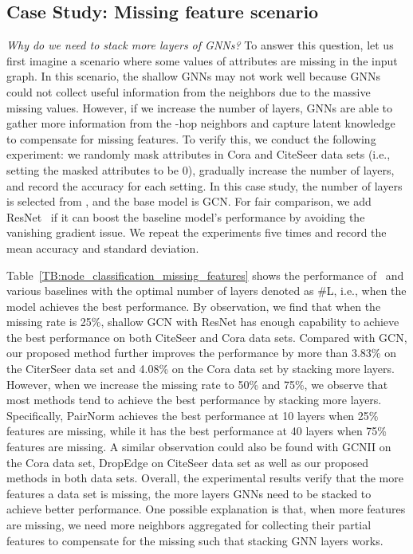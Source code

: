 \subsection{Case Study: Missing feature scenario}
\label{Missing_feature_scenario}
\emph{Why do we need to stack more layers of GNNs?} To answer this question, let us first imagine a scenario where some values of attributes are missing in the input graph. In this scenario, the shallow GNNs may not work well because GNNs could not collect useful information from the neighbors due to the massive missing values. However, if we increase the number of layers, GNNs are able to gather more information from the -hop neighbors and capture latent knowledge to compensate for missing features. To verify this, we conduct the following experiment: we randomly mask  attributes in Cora and CiteSeer data sets (i.e., setting the masked attributes to be 0), gradually increase the number of layers, and record the accuracy for each setting. In this case study, the number of layers is selected from , and the base model is GCN. For fair comparison, we add ResNet~\citep{DBLP:conf/cvpr/HeZRS16} if it can boost the baseline model's performance by avoiding the vanishing gradient issue. We repeat the experiments five times and record the mean accuracy and standard deviation. 


Table~\ref{TB:node_classification_missing_features} shows the performance of \name\ and various baselines with the optimal number of layers denoted as \#L, i.e., when the model achieves the best performance. By observation, we find that when the missing rate is 25\%, shallow GCN with ResNet has enough capability to achieve the best performance on both CiteSeer and Cora data sets. Compared with GCN, our proposed method further improves the performance by more than 3.83\% on the CiterSeer data set and 4.08\% on the Cora data set by stacking more layers. However, when we increase the missing rate to 50\% and 75\%, we observe that most methods tend to achieve the best performance by stacking more layers. Specifically, PairNorm achieves the best performance at 10 layers when 25\% features are missing, while it has the best performance at 40 layers when 75\% features are missing. A similar observation could also be found with GCNII on the Cora data set, DropEdge on CiteSeer data set as well as our proposed methods in both data sets.
Overall, the experimental results verify that the more features a data set is missing, the more layers GNNs need to be stacked to achieve better performance.
One possible explanation is that, when more features are missing, we need more neighbors aggregated for collecting their partial features to compensate for the missing such that stacking GNN layers works.


